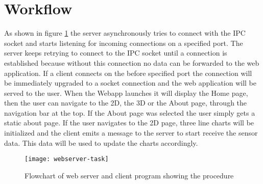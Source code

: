 \section{Workflow}

As shown in figure \ref{fig:webserver-program-flow} the server asynchronously tries to connect with the IPC socket and starts listening for incoming connections on a specified port. The server keeps retrying to connect to the IPC socket until a connection is established because without this connection no data can be forwarded to the web application. If a client connects on the before specified port the connection will be immediately upgraded to a socket connection and the web application will be served to the user. When the Webapp launches it will display the Home page, then the user can navigate to the 2D, the 3D or the About page, through the navigation bar at the top. If the About page was selected the user simply gets a static about page. If the user navigates to the 2D page, three line charts will be initialized and the client emits a message to the server to start receive the sensor data. This data will be used to update the charts accordingly.

\begin{figure}[H]
    \centering
    \texttt{[image: webserver-task]}
    \caption{Flowchart of web server and client program showing the procedure}
    \label{fig:webserver-program-flow}
\end{figure}
